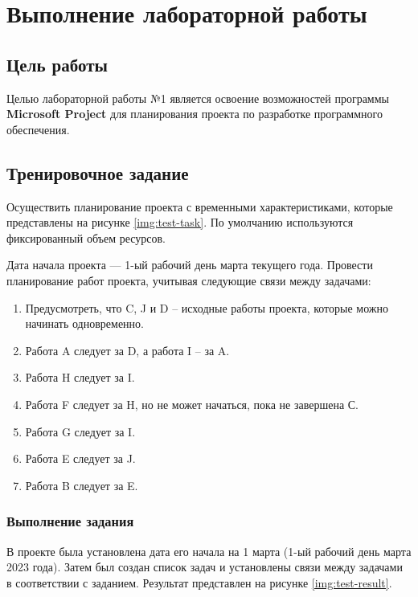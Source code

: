 
\chapter{Выполнение лабораторной работы}


\section{Цель работы}

Целью лабораторной работы №1 является освоение возможностей программы \textbf{Microsoft Project} для планирования проекта по разработке программного обеспечения.



\section{Тренировочное задание}

Осуществить планирование проекта с временными характеристиками, которые представлены на рисунке \ref{img:test-task}. По умолчанию используются фиксированный объем ресурсов.


Дата начала проекта --- 1-ый рабочий день марта текущего года. Провести планирование работ проекта, учитывая следующие связи между задачами:

\begin{enumerate}
    \item Предусмотреть, что C, J и D – исходные работы проекта, которые можно
    начинать одновременно.
    \item Работа A следует за D, а работа I – за A.
    \item Работа H следует за I.
    \item Работа F следует за H, но не может начаться, пока не завершена С.
    \item Работа G следует за I.
    \item Работа E следует за J.
    \item Работа B следует за E.
\end{enumerate}


\subsection{Выполнение задания}

В проекте была установлена дата его начала на 1 марта (1-ый рабочий день марта 2023 года). Затем был создан список задач и установлены связи между задачами в соответствии с заданием. Результат представлен на рисунке \ref{img:test-result}.


